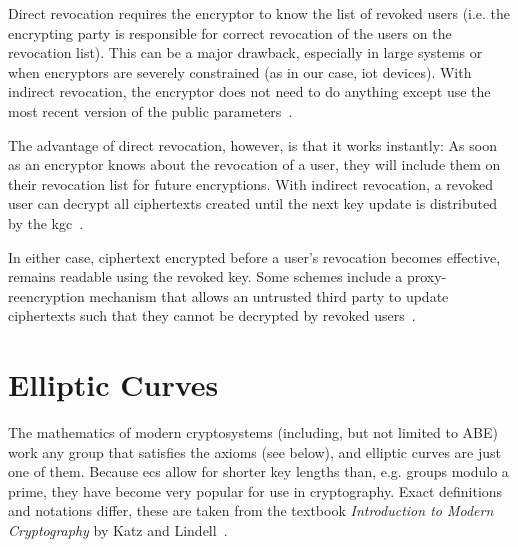 Direct revocation requires the encryptor to know the list of revoked users \cite{attrapadung_attribute-based_2009} (i.e. the encrypting party is responsible for correct revocation of the users on the revocation list).
This can be a major drawback, especially in large systems or when encryptors are severely constrained (as in our case, \gls{iot} devices).
With indirect revocation, the encryptor does not need to do anything except use the most recent version of the public parameters~\cite{attrapadung_attribute-based_2009}.

The advantage of direct revocation, however, is that it works instantly: As soon as an encryptor knows about the revocation of a user, they will include them on their revocation list for future encryptions.
With indirect revocation, a revoked user can decrypt all ciphertexts created until the next key update is distributed by the \acrshort{kgc}~\cite{attrapadung_attribute-based_2009}.

In either case, ciphertext encrypted before a user's revocation becomes effective, remains readable using the revoked key.
Some schemes include a proxy-reencryption mechanism that allows an untrusted third party to update ciphertexts such that they cannot be decrypted by revoked users~\cite{manna_sea-brew_2021}.

\section{Elliptic Curves}
\label{sec:ec}

The mathematics of modern cryptosystems (including, but not limited to ABE) work any group that satisfies the axioms (see below), and elliptic curves are just one of them.
Because \Glspl{ec} allow for shorter key lengths than, e.g. groups modulo a prime, they have become very popular for use in cryptography.
Exact definitions and notations differ, these are taken from the textbook \emph{Introduction to Modern Cryptography} by Katz and Lindell~\cite{katz_introduction_2015}.

